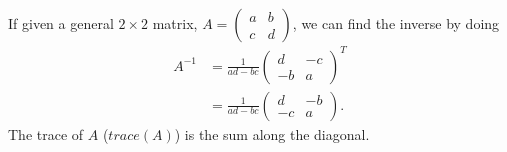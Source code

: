 If given a general $2\times 2$ matrix, $A=\begin{pmatrix} a&b\\c&d \end{pmatrix} $, we can find the inverse by doing 
\begin{align*}
  A^{-1}&=\frac{1}{ad-bc}\begin{pmatrix} d&-c\\-b&a \end{pmatrix} ^{T}\\
        &=\frac{1}{ad-bc}\begin{pmatrix} d&-b\\-c&a \end{pmatrix} 
.\end{align*}
The trace of $A$ ($trace(A)$) is the sum along the diagonal.
